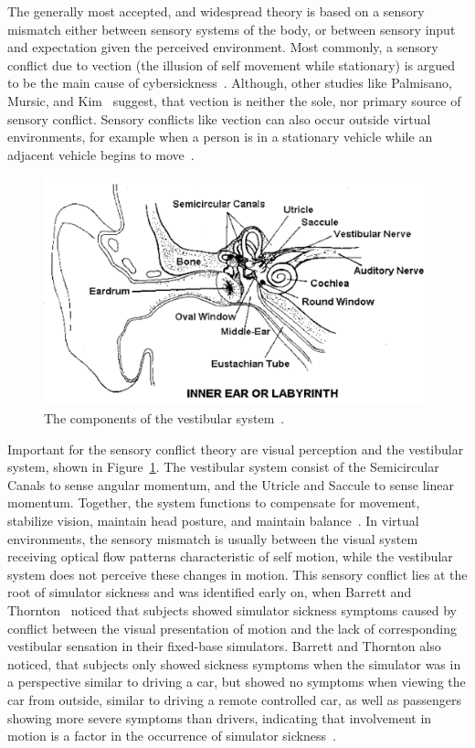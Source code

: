 The generally most accepted, and widespread theory is based on a sensory mismatch either between sensory systems of the
body, or between sensory input and expectation given the perceived environment.
Most commonly, a sensory conflict due to vection (the illusion of self movement while stationary) is argued to be the
main cause of cybersickness~\cite{Weech2018,Keshavarz2019}.
Although, other studies like Palmisano, Mursic, and Kim~\cite{Palmisano2017} suggest, that vection is neither the
sole, nor primary source of sensory conflict.
Sensory conflicts like vection can also occur outside virtual environments, for example when a person is in a
stationary vehicle while an adjacent vehicle begins to move~\cite{LaViola2000}.

\begin{figure}[h]
    \centering
    \includegraphics[width=\textwidth]{content/related_work/img/VestibularSystem[LaViola2000]}
    \caption{The components of the vestibular system~\cite{LaViola2000}.}
    \label{fig:vestibular-system}
\end{figure}
Important for the sensory conflict theory are visual perception and the vestibular system, shown in
Figure~\ref{fig:vestibular-system}.
The vestibular system consist of the Semicircular Canals to sense angular momentum, and the Utricle and Saccule to
sense linear momentum.
Together, the system functions to compensate for movement, stabilize vision, maintain head posture, and maintain
balance~\cite{Walker2014}.
In virtual environments, the sensory mismatch is usually between the visual system receiving optical flow patterns
characteristic of self motion, while the vestibular system does not perceive these changes in motion.
This sensory conflict lies at the root of simulator sickness and was identified early on, when Barrett and
Thornton~\cite{Barrett1968} noticed that subjects showed simulator sickness symptoms caused by conflict between the
visual presentation of motion and the lack of corresponding vestibular sensation in their fixed-base simulators.
Barrett and Thornton also noticed, that subjects only showed sickness symptoms when the simulator was in a
perspective similar to driving a car, but showed no symptoms when viewing the car from outside, similar to driving a
remote controlled car, as well as passengers showing more severe symptoms than drivers, indicating
that involvement in motion is a factor in the occurrence of simulator sickness~\cite{Tiiro2018,Barrett1968}.

